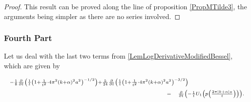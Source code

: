 \documentclass{jams-l}
\theoremstyle{definition}
\theoremstyle{remark}
\numberwithin{equation}{section}
\begin{document}
                \begin{proof}
                
                    This result can be proved along the line of proposition \ref{PropMTilde3}, the arguments being simpler as there are no series involved.
                
                \end{proof}
                
                
            \subsubsection*{\textbf{Fourth Part}}
            \label{MTildeFourthPart}
            
                Let us deal with the last two terms from \ref{LemLogDerivativeModifiedBessel}, which are given by
                
                \[ \begin{array}{lll}
                        \multicolumn{3}{l}{\scriptstyle - \frac{1}{8} \frac{\partial}{\partial t} \left( \frac{1}{t} \left( 1 + \frac{1}{t^2} \cdot 4 \pi^2 \left( k + \alpha \right)^2 a^2 \right)^{-1/2} \right) + \frac{5}{24} \frac{\partial}{\partial t} \left( \frac{1}{t} \left( 1 + \frac{1}{t^2} \cdot 4 \pi^2 \left( k + \alpha \right)^2 a^2 \right)^{-3/2} \right)} \\[0.5em]
                        
                        \qquad \qquad \qquad \qquad \qquad \qquad \qquad \qquad \qquad \qquad \qquad & \scriptstyle = & \scriptstyle \frac{\partial}{\partial t} \left( - \frac{1}{t} U_1 \left( p \left( \frac{2 \pi \left \vert k + \alpha \right \vert a}{t} \right) \right) \right).
                    \end{array} \]
                
\end{document}
